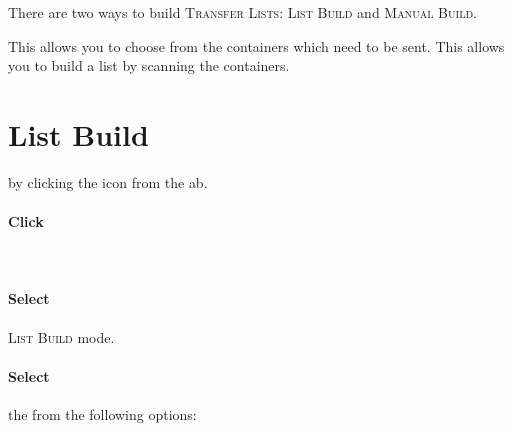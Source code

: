 There are two ways to build \textsc{Transfer Lists}: \textsc{List Build} and \textsc{Manual Build}.


\begin{description}
     This allows you to choose from the containers which need to be sent.
     This allows you to build a list by scanning the containers.
\end{description}

\section{List Build}

 by clicking the  icon from the \gls{ab}.\\

\paragraph{Click}  \\


\paragraph{Select} \textsc{List Build} mode.\\


\paragraph{Select} the  from the following options:

